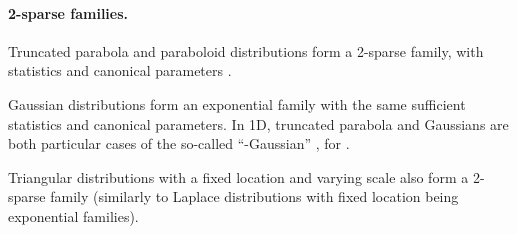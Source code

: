 \documentclass{article}
\newcommand{\remove}[1]{}
\begin{document}
\paragraph{2-sparse families.} 
Truncated parabola and paraboloid distributions form a 2-sparse family, with statistics  and  canonical parameters . 
\remove{
From (\ref{eq:sparsemax}--\ref{eq:truncated_parabola}):

Contrast this expression with the one for Gaussian distributions, which form an exponential family with the same sufficient statistics and canonical parameters, for which .
}
Gaussian distributions form an exponential family with the same sufficient statistics and canonical parameters. 
In 1D, truncated parabola and Gaussians are both particular cases of the so-called ``-Gaussian'' \citep[\S 4.1]{naudts2009q}, for . 
\remove{Fig.~\ref{fig:gaussian_laplacian_distributions} (right) shows -Gaussian distributions for .}
Triangular distributions with a fixed location  and varying scale  also form a 2-sparse family (similarly to Laplace distributions with fixed location being exponential families).

\begin{comment}
\begin{wrapfigure}{r}{0.45\columnwidth}
\centering
\texttt{[image: figures/sparse\_distributions]}
\caption{{\bf Location-scale families with different -Tsallis regularizations.} Left: Gaussian and truncated parabola distributions with zero mean and different variances. Middle: same for Laplace and triangular distributions. Right: Distributions  for varying . \label{fig:gaussian_laplacian_distributions}}
\end{wrapfigure}
\end{comment}
\end{document}
